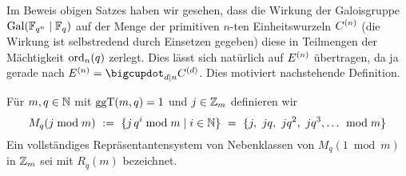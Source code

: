 Im Beweis obigen Satzes haben wir gesehen, dass die Wirkung der Galoisgruppe
$\operatorname{Gal}(\mathbb{F}_{q^n}\mid \mathbb{F}_q)$ auf der Menge der primitiven $n$-ten Einheitswurzeln
$C^{(n)}$ (die Wirkung ist selbstredend durch Einsetzen gegeben) diese in 
Teilmengen der Mächtigkeit $\operatorname{ord}_n(q)$ zerlegt.
Dies lässt sich natürlich auf $E^{(n)}$ übertragen, da ja gerade 
nach 
$E\kl n = \bigcupdot_{d\mid n} C\kl d$. 
Dies motiviert nachstehende Definition.


  


\begin{definition}
  Für $m,q\in\mathbb{N}$ mit $\operatorname{ggT}(m,q) = 1$ und $j \in \mathbb{Z}_m$ definieren wir
  \[ M_q(j\bmod m) \ :=\  \{ j\,q^i \bmod m\mid i\in\mathbb{N}\} \ =\  
    \{j,\ jq,\ jq^2,\ jq^3,\ldots\ \bmod m\}\]
  Ein vollständiges Repräsentantensystem von Nebenklassen von $M_q(1\bmod m)$
  in $\mathbb{Z}_m$ sei mit $R_q(m)$ bezeichnet.
\end{definition}


